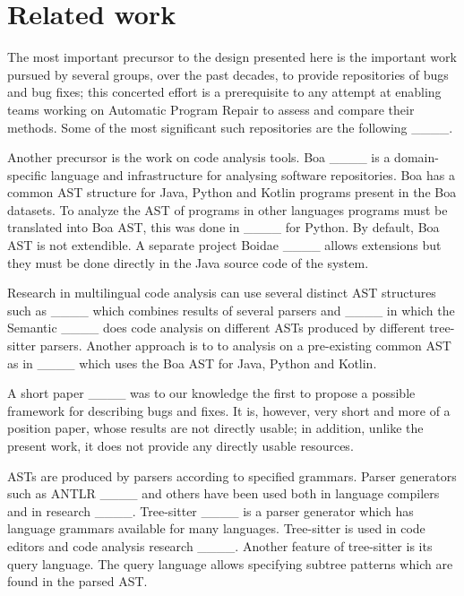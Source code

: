 \section{Related work}
\label{related_work}
The most important precursor to the design presented here is the important work
pursued by several groups, over the past decades, to provide repositories of
bugs and bug fixes; this concerted effort is a prerequisite to any attempt at
enabling teams working on Automatic Program Repair to assess and compare their
methods. Some of the most significant such repositories are the following ____.

Another precursor is the work on code analysis tools. Boa ____ is a
domain-specific language and infrastructure for analysing software repositories.
Boa has a common AST structure for Java, Python and Kotlin programs present
in the Boa datasets. To analyze the AST of programs in other languages programs
must be translated into Boa AST, this was done in ____ for
Python. By default, Boa AST is not extendible. A separate project Boidae
____ allows extensions but they must be done directly
in the Java source code of the system.

Research in multilingual code analysis can use several distinct AST structures
such as ____ which combines results
of several parsers and ____
in which the Semantic ____ does code analysis on different
ASTs produced by different tree-sitter parsers.
Another approach is to to analysis on a pre-existing common AST as in
____ which uses the Boa AST for Java, Python and Kotlin.

A short paper ____ was to our knowledge the first to propose a possible framework for describing bugs and fixes. It is, however, very short and more of a position paper, whose results are not directly usable; in addition, unlike the present work, it does not provide any directly usable resources.

ASTs are produced by parsers according to specified grammars. Parser generators
such as ANTLR ____ and others have been used both in language compilers
and in research ____. Tree-sitter
____ is a parser generator which has language grammars
available for many languages. Tree-sitter is used in code editors and code
analysis research ____.
Another feature of tree-sitter is its query language. The query language allows
specifying subtree patterns which are found in the parsed AST.